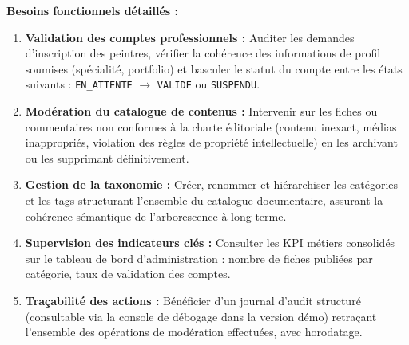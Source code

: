 \documentclass[12pt,a4paper]{report}
\begin{document}
\vspace{0.5em}
\textbf{Besoins fonctionnels détaillés :}

\begin{enumerate}[leftmargin=1.5cm, label=\textbf{BF-\arabic*.}, itemsep=5pt]
    \item \textbf{Validation des comptes professionnels :} Auditer les demandes d'inscription des peintres, vérifier la cohérence des informations de profil soumises (spécialité, portfolio) et basculer le statut du compte entre les états suivants : \texttt{EN\_ATTENTE} $\rightarrow$ \texttt{VALIDE} ou \texttt{SUSPENDU}.
    \item \textbf{Modération du catalogue de contenus :} Intervenir sur les fiches ou commentaires non conformes à la charte éditoriale (contenu inexact, médias inappropriés, violation des règles de propriété intellectuelle) en les archivant ou les supprimant définitivement.
    \item \textbf{Gestion de la taxonomie :} Créer, renommer et hiérarchiser les catégories et les tags structurant l'ensemble du catalogue documentaire, assurant la cohérence sémantique de l'arborescence à long terme.
    \item \textbf{Supervision des indicateurs clés :} Consulter les KPI métiers consolidés sur le tableau de bord d'administration : nombre de fiches publiées par catégorie, taux de validation des comptes.
    \item \textbf{Traçabilité des actions :} Bénéficier d'un journal d'audit structuré (consultable via la console de débogage dans la version démo) retraçant l'ensemble des opérations de modération effectuées, avec horodatage.
\end{enumerate}
\end{document}
